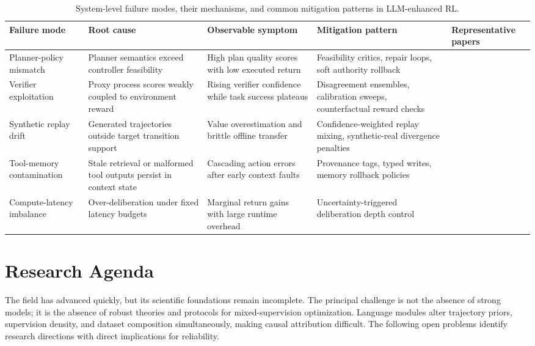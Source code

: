 \documentclass[pdflatex,sn-mathphys-num]{sn-jnl}
\begin{document}
\begin{table}[t]
\centering
\small
\setlength{\tabcolsep}{4pt}
\begin{tabularx}{\textwidth}{P{2.1cm}P{2.4cm}P{2.2cm}P{2.4cm}Y}
\toprule
\textbf{Failure mode} & \textbf{Root cause} & \textbf{Observable symptom} & \textbf{Mitigation pattern} & \textbf{Representative papers}\\
\midrule
Planner-policy mismatch & Planner semantics exceed controller feasibility & High plan quality scores with low executed return & Feasibility critics, repair loops, soft authority rollback & \cite{arxiv_p_2204_01691,arxiv_p_2405_01534,arxiv_p_2512_12716}\\
Verifier exploitation & Proxy process scores weakly coupled to environment reward & Rising verifier confidence while task success plateaus & Disagreement ensembles, calibration sweeps, counterfactual reward checks & \cite{arxiv_p_2602_06493,arxiv_p_2602_12579,arxiv_p_2602_02395}\\
Synthetic replay drift & Generated trajectories outside target transition support & Value overestimation and brittle offline transfer & Confidence-weighted replay mixing, synthetic-real divergence penalties & \cite{arxiv_p_2602_02454,arxiv_p_2602_11075,arxiv_p_2601_08107}\\
Tool-memory contamination & Stale retrieval or malformed tool outputs persist in context state & Cascading action errors after early context faults & Provenance tags, typed writes, memory rollback policies & \cite{arxiv_p_2404_03648,arxiv_p_2602_00994,arxiv_p_2601_07264}\\
Compute-latency imbalance & Over-deliberation under fixed latency budgets & Marginal return gains with large runtime overhead & Uncertainty-triggered deliberation depth control & \cite{arxiv_p_2602_07848,arxiv_p_2602_14234,arxiv_p_2510_06727}\\
\bottomrule
\end{tabularx}
\caption{System-level failure modes, their mechanisms, and common mitigation patterns in LLM-enhanced RL.}
\label{tab:t6_failure}
\end{table}

\section{Research Agenda}
The field has advanced quickly, but its scientific foundations remain incomplete. The principal challenge is not the absence of strong models; it is the absence of robust theories and protocols for mixed-supervision optimization. Language modules alter trajectory priors, supervision density, and dataset composition simultaneously, making causal attribution difficult. The following open problems identify research directions with direct implications for reliability.
\end{document}

